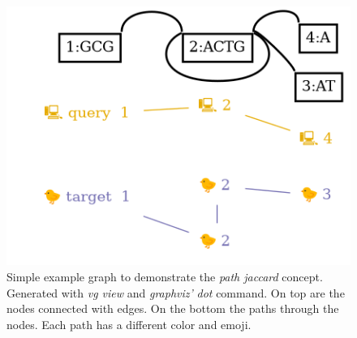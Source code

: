 \begin{figure}[ht!]
	\includegraphics[width=1.0\linewidth]{fig/jaccard/jaccard.png}
	\caption{Simple example graph to demonstrate the \textit{path jaccard} concept. Generated with \textit{vg view} and \textit{graphviz'} \textit{dot} command. On top are the nodes connected with edges. On the bottom the paths through the nodes. Each path has a different color and emoji.}
	\label{fig:jaccard}
\end{figure}